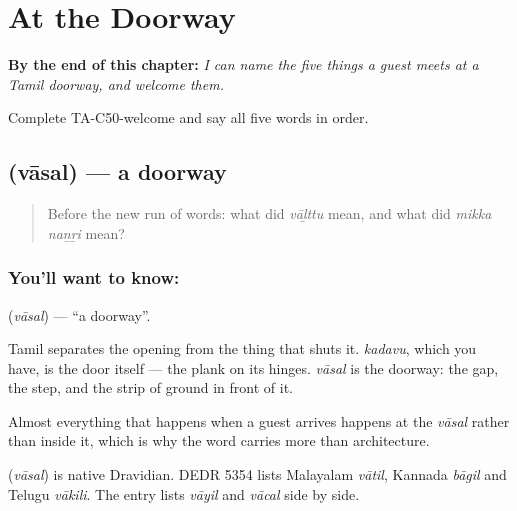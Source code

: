 
\chapter{At the Doorway}
\label{ch:ta-at-the-doorway}

\begin{chapteropening}
\textbf{By the end of this chapter:} \emph{I can name the five things a guest meets at a Tamil doorway, and welcome them.}

Complete TA-C50-welcome and say all five words in order.
\end{chapteropening}

\section[\texorpdfstring{\ta{வாசல்} (vāsal)}{வாசல் (vāsal)}]{ (vāsal) — a doorway}

\label{lesson:TA-C50-threshold}



\begin{quote}
Before the new run of words: what did \emph{vāḻttu} mean, and what did \emph{mikka naṉṟi} mean?
\end{quote}

\subsection*{You'll want to know: }
\textbf{} (\emph{vāsal}) — \textquotedblleft{}a doorway\textquotedblright{}.

Tamil separates the opening from the thing that shuts it. \emph{kadavu}, which you have, is the door itself — the plank on its hinges. \emph{vāsal} is the doorway: the gap, the step, and the strip of ground in front of it.

Almost everything that happens when a guest arrives happens at the \emph{vāsal} rather than inside it, which is why the word carries more than architecture.

\begin{cousinweb}
\textbf{} (\emph{vāsal}) is native Dravidian. DEDR 5354 lists Malayalam \emph{vātil}, Kannada \emph{bāgil} and Telugu \emph{vākili}. The entry lists \emph{vāyil} and \emph{vācal} side by side.
\end{cousinweb}

